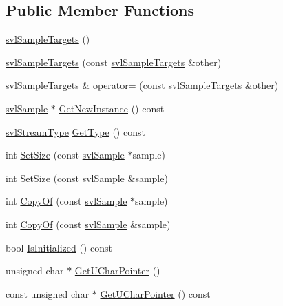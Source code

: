 \subsection*{Public Member Functions}
\begin{DoxyCompactItemize}
\item 
\hyperlink{classsvl_sample_targets_ac9f921451c1dfbce6bad501aaad97c68}{svl\-Sample\-Targets} ()
\item 
\hyperlink{classsvl_sample_targets_aded61e79647f0b49e05a8bad9030f9ca}{svl\-Sample\-Targets} (const \hyperlink{classsvl_sample_targets}{svl\-Sample\-Targets} \&other)
\item 
\hyperlink{classsvl_sample_targets}{svl\-Sample\-Targets} \& \hyperlink{classsvl_sample_targets_a965bfc403c3c928eea0c583e3deeed89}{operator=} (const \hyperlink{classsvl_sample_targets}{svl\-Sample\-Targets} \&other)
\item 
\hyperlink{classsvl_sample}{svl\-Sample} $\ast$ \hyperlink{classsvl_sample_targets_afc8ba05aa433e48e15231157c7d93345}{Get\-New\-Instance} () const 
\item 
\hyperlink{svl_definitions_8h_aa00696d338a58db361335a01fd11e122}{svl\-Stream\-Type} \hyperlink{classsvl_sample_targets_a0084b2b248b248849bcfa910e92b666a}{Get\-Type} () const 
\item 
int \hyperlink{classsvl_sample_targets_aa5464729d31ba293f0785ef9a9763568}{Set\-Size} (const \hyperlink{classsvl_sample}{svl\-Sample} $\ast$sample)
\item 
int \hyperlink{classsvl_sample_targets_a9814be565c027352b5e6e316ced75e22}{Set\-Size} (const \hyperlink{classsvl_sample}{svl\-Sample} \&sample)
\item 
int \hyperlink{classsvl_sample_targets_aabec01406fc42fdb02bf476d9b073fc4}{Copy\-Of} (const \hyperlink{classsvl_sample}{svl\-Sample} $\ast$sample)
\item 
int \hyperlink{classsvl_sample_targets_aab182c9a18295bc72205bb1878c82174}{Copy\-Of} (const \hyperlink{classsvl_sample}{svl\-Sample} \&sample)
\item 
bool \hyperlink{classsvl_sample_targets_a19871a3e24c36e9461b68fd8dda6f620}{Is\-Initialized} () const 
\item 
unsigned char $\ast$ \hyperlink{classsvl_sample_targets_acd6584941b91a121d488e49de6a1aaea}{Get\-U\-Char\-Pointer} ()
\item 
const unsigned char $\ast$ \hyperlink{classsvl_sample_targets_a409dfa9f2adbc442b1a6a9c8110675cd}{Get\-U\-Char\-Pointer} () const 
\item 

\end{DoxyCompactItemize}
